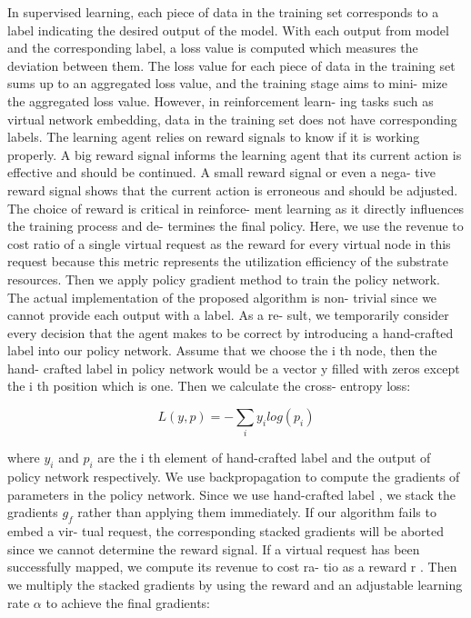 \documentclass[12pt]{article}
\begin{document}
In supervised learning, each piece of data in the training set
corresponds to a label indicating the desired output of the model.
With each output from model and the corresponding label, a loss
value is computed which measures the deviation between them.
The loss value for each piece of data in the training set sums up
to an aggregated loss value, and the training stage aims to mini-
mize the aggregated loss value. However, in reinforcement learn-
ing tasks such as virtual network embedding, data in the training
set does not have corresponding labels. The learning agent relies
on reward signals to know if it is working properly. A big reward
signal informs the learning agent that its current action is effective
and should be continued. A small reward signal or even a nega-
tive reward signal shows that the current action is erroneous and
should be adjusted. The choice of reward is critical in reinforce-
ment learning as it directly influences the training process and de-
termines the final policy. Here, we use the revenue to cost ratio of
a single virtual request as the reward for every virtual node in this
request because this metric represents the utilization efficiency of
the substrate resources. Then we apply policy gradient method to
train the policy network.
The actual implementation of the proposed algorithm is non-
trivial since we cannot provide each output with a label. As a re-
sult, we temporarily consider every decision that the agent makes
to be correct by introducing a hand-crafted label into our policy
network. Assume that we choose the i th node, then the hand-
crafted label in policy network would be a vector y filled with zeros
except the i th position which is one. Then we calculate the cross-
entropy loss:

\begin{equation}
L(y, p) = - \sum_{i}y_ilog(p_i)
\end{equation}

where $y_i$ and $p_i$ are the i th element of hand-crafted label and the
output of policy network respectively. We use backpropagation to
compute the gradients of parameters in the policy network. Since
we use hand-crafted label , we stack the gradients $g_f$ rather than
applying them immediately. If our algorithm fails to embed a vir-
tual request, the corresponding stacked gradients will be aborted
since we cannot determine the reward signal. If a virtual request
has been successfully mapped, we compute its revenue to cost ra-
tio as a reward r . Then we multiply the stacked gradients by using
the reward and an adjustable learning rate $\alpha$ to achieve the final gradients:
\end{document}
